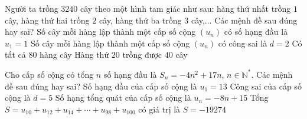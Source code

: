 \begin{ex}%
	Người ta trồng $3240$ cây theo một hình tam giác như sau: hàng thứ nhất trồng $1$ cây, hàng thứ hai trồng $2$ cây, hàng thứ ba trồng $3$ cây,$\ldots$ Các mệnh đề sau đúng hay sai?
	\choiceTF
	{\True Số cây mỗi hàng lập thành một cấp số cộng $(u_n)$ có số hạng đầu là $u_1=1$}
	{Số cây mỗi hàng lập thành một cấp số cộng $(u_n)$ có công sai là $d=2$}
	{\True Có tất cả $80$ hàng cây}
	{Hàng thứ $20$ trồng được $40$ cây}
\end{ex}

\begin{ex}%
	Cho cấp số cộng có tổng $n$ số hạng đầu là $S_n=-4n^2+17n$, $n\in\mathbb{N}^*$. Các mệnh đề sau đúng hay sai?
	\choiceTF
	{\True Số hạng đầu của cấp số cộng là $u_1=13$}
	{Công sai của cấp số cộng là $d=5$}
	{Số hạng tổng quát của cấp số cộng là $u_n=-8n+15$}
	{\True Tổng $S=u_{10}+u_{12}+u_{14}+\cdots +u_{98}+u_{100}$ có giá trị là $S=-19274$}
\end{ex}

